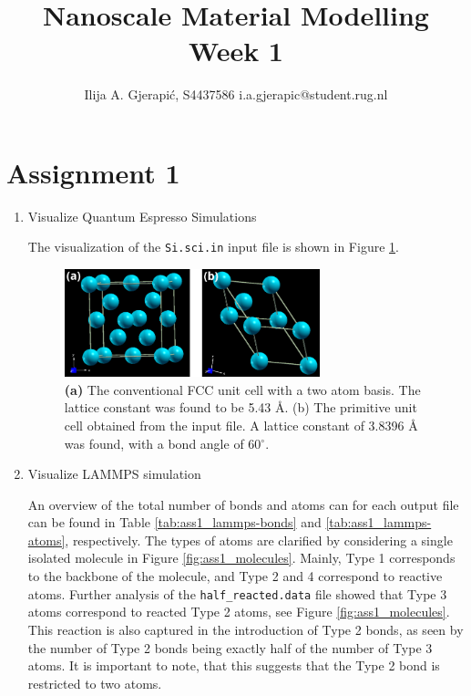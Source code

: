 \documentclass[10pt,a4paper]{labreport}
\title{Nanoscale Material Modelling
\\
\normalsize{Week 1}} %
\author{Ilija A. Gjerapić, S4437586 i.a.gjerapic@student.rug.nl} %
\begin{document}
\maketitle



  

\thispagestyle{firststyle}
\newpage
\section{Assignment 1}
\begin{enumerate}
  \item Visualize Quantum Espresso Simulations
  
  The visualization of the \texttt{Si.sci.in} input file is shown in Figure \ref{fig:ass1_cryst}. 
  \begin{figure}[h]
    \centering 
    \includegraphics[width = 0.7\textwidth]{figs/ass1_Si_cryst.png}
    \caption{\textbf{(a)} The conventional FCC unit cell with a two atom basis. The lattice constant was found to be 5.43 \AA. (b) The primitive unit cell obtained from the input file. A lattice constant of 3.8396 {\AA} was found, with a bond angle of 60$^\circ$.}
    \label{fig:ass1_cryst}
  \end{figure}

  \item Visualize LAMMPS simulation 
  
  An overview of the total number of bonds and atoms can for each output file can be found in Table \ref{tab:ass1_lammps-bonds} and \ref{tab:ass1_lammps-atoms}, respectively.
  The types of atoms are clarified by considering a single isolated molecule in Figure \ref{fig:ass1_molecules}. Mainly, Type 1 corresponds to the backbone of the molecule, and Type 2 and 4 correspond to reactive atoms. Further analysis of the \texttt{half\_reacted.data} file showed that Type 3 atoms correspond to reacted Type 2 atoms, see Figure \ref{fig:ass1_molecules}. This reaction is also captured in the introduction of Type 2 bonds, as seen by the number of Type 2 bonds being exactly half of the number of Type 3 atoms. It is important to note, that this suggests that the Type 2 bond is restricted to two atoms. 


\end{enumerate}
\end{document}
